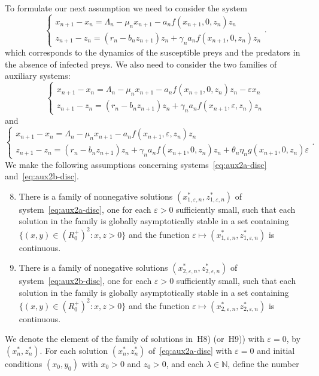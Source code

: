\documentclass[reqno]{amsart}
\newcommand{\eps}{\varepsilon}
\newcommand{\N}{\ensuremath{\mathds N}}
\begin{document}
{{To formulate our next assumption we need to consider the system
\begin{equation}\label{eq:aux2-disc}
\begin{cases}
x_{n+1}-x_n=\Lambda_n-\mu_n x_{n+1}-a_n{f(x_{n+1},0,z_n)z_n}\\
z_{n+1}-z_n=(r_n-b_nz_{n+1})z_n+\gamma_na_n{f(x_{n+1},0,z_n)z_n}
\end{cases}.
\end{equation}
which corresponds to the dynamics of the susceptible preys and the predators in the absence of infected preys.
We also need to consider the two families of auxiliary systems:
\begin{equation}\label{eq:aux2a-disc}
\begin{cases}
x_{n+1}-x_n=\Lambda_n-\mu_n x_{n+1}-a_n{f(x_{n+1},0,z_n)z_n}-\eps x_n\\
z_{n+1}-z_n=(r_n-b_nz_{n+1})z_n+\gamma_na_n{f(x_{n+1},\eps,z_n)z_n}
\end{cases}
\end{equation}
and
\begin{equation}\label{eq:aux2b-disc}
\begin{cases}
x_{n+1}-x_n=\Lambda_n-\mu_n x_{n+1}-a_n{f(x_{n+1},\eps,z_n)z_n}\\
z_{n+1}-z_n=(r_n-b_nz_{n+1})z_n+\gamma_na_n{f(x_{n+1},0,z_n)z_n}+\theta_n\eta_ng(x_{n+1},0,z_n)\eps
\end{cases}.
\end{equation}
We make the following assumptions concerning systems~\eqref{eq:aux2a-disc} and~\eqref{eq:aux2b-disc}.
\begin{enumerate}[H$1$)]
\setcounter{enumi}{7}
\item \label{Cond-4}
There is a family of nonnegative solutions $(x^*_{1,\eps,n},z^*_{1,\eps,n})$ of system~\eqref{eq:aux2a-disc}, one for each $\eps>0$ sufficiently small, such that each solution in the family is globally asymptotically stable in a set containing $\{(x,y) \in (R_0^+)^2: x,z>0\}$ and the function $\eps \mapsto (x^*_{1,\eps,n},z^*_{1,\eps,n})$ is continuous.
\item \label{Cond-5}
There is a family of nonegative solutions $(x^*_{2,\eps,n},z^*_{2,\eps,n})$ of system~\eqref{eq:aux2b-disc}, one for each $\eps>0$ sufficiently small, such that each solution in the family is globally asymptotically stable in a set containing $\{(x,y) \in (R_0^+)^2: x,z>0\}$ and the function $\eps \mapsto (x^*_{2,\eps,n},z^*_{2,\eps,n})$ is continuous.
\end{enumerate}
We denote the element of the family of solutions in~{H8)}  (or~{H9)}) with $\eps=0$, by $(x^*_n,z^*_n)$. For each solution $(x^*_n,z^*_n)$ of~\eqref{eq:aux2a-disc} with $\eps=0$ and initial conditions $(x_0,y_0)$ with $x_0>0$ and $z_0>0$, and each $\lambda \in \N$, define the number
}}
\end{document}
